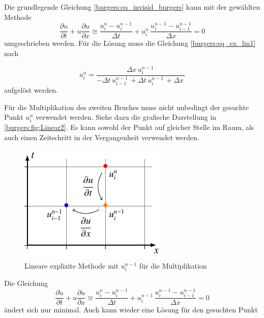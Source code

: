 	Die grundlegende Gleichung \eqref{burgers:eq_invisid_burgers} kann mit der gewählten Methode
	\begin{equation}
	  	\frac {\partial u}{\partial t}+u{\frac {\partial u}{\partial x}} \cong \frac{u_{i}^{n}-u_{i}^{n-1}}{\Delta t}+ u_{i}^{n}\, \frac{u_{i}^{n-1}-u_{i-1}^{n-1}}{\Delta x}=0
	  	  \label{burgers:eq_ex_lin1}
	  	\end{equation}
        umgeschrieben werden.
	  	Für die Lösung muss die Gleichung \eqref{burgers:eq_ex_lin1} nach

	  	\begin{equation}
	  u_{i}^{n} = \frac{\Delta{x}\, u^{n-1}_{i}\,}{- \Delta{t}\, u^{n-1}_{i-1}\, + \Delta{t}\, u^{n-1}_{i}\, + \Delta{x}\,}
		  \label{burgers:eq_ex_sol_lin1}
	\end{equation}
 	aufgelöst werden.

\medskip

	Für die Multiplikation des zweiten Bruches muss nicht unbedingt der gesuchte Punkt $u_{i}^{n}$ verwendet werden.
	Siehe dazu die grafische Darstellung in \autoref{burgers:fig:Linear2}.
	Es kann sowohl der Punkt auf gleicher Stelle im Raum, als auch einen Zeitschritt in der Vergangenheit verwendet werden.


     \begin{figure}
	\centering
	\includegraphics[height=.4\textwidth]{papers/burgers/BurgersEquation/tikz/linear2/linear2.pdf}
	\caption{Lineare explizite Methode mit  $u_{i}^{n-1}$ f\"ur die Multiplikation}
	\label{burgers:fig:Linear2}
	\end{figure}
	Die Gleichung
	\begin{equation}
			\frac {\partial u}{\partial t}+u{\frac {\partial u}{\partial x}} \cong \frac{u_{i}^{n}-u_{i}^{n-1}}{\Delta t}+ u_{i}^{n-1}\, \frac{u_{i}^{n-1}-u_{i-1}^{n-1}}{\Delta x}=0
		\label{burgers:eq_ex_lin2}
	\end{equation}
	ändert sich nur minimal.
	 Auch kann wieder eine Lösung für den gesuchten Punkt

